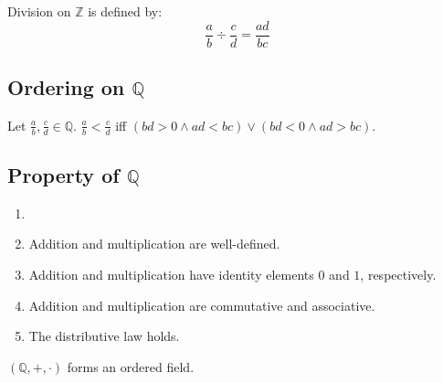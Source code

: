 \documentclass{report}
\begin{document}
			\begin{defn} \label{def_div_Q}
				Division on $\mathbb{Z}$ is defined by:
				\begin{displaymath}
					\frac{a}{b}\div\frac{c}{d}=\frac{ad}{bc}
				\end{displaymath}
			\end{defn}
		
		\subsection{Ordering on $\mathbb{Q}$}
		
			\begin{defn} \label{def_order_Q}
				Let $\frac{a}{b},\frac{c}{d} \in \mathbb{Q}$. $\frac{a}{b}<\frac{c}{d}$ iff $(bd>0 \wedge ad<bc) \vee (bd<0 \wedge ad>bc)$.
			\end{defn}
			
\begin{comment}%
			\begin{prop}
				The subset $P=\{\frac{a}{b}\in\mathbb{Q}|ab>0}$ is a positive set in $\mathbb{Q}$.
			\end{prop}
\end{comment}
		
		\subsection{Property of $\mathbb{Q}$}
		
			\begin{thm} \label{thm_property_Q}
				\begin{enumerate}
					\item[]
					\item Addition and multiplication are well-defined.
					\item Addition and multiplication have identity elements $0$ and $1$, respectively.
					\item Addition and multiplication are commutative and associative.
					\item The distributive law holds.
				\end{enumerate}
			\end{thm}
		
			\begin{thm}
				$(\mathbb{Q},+,\cdot)$ forms an ordered field.
			\end{thm}
		
\end{document}
